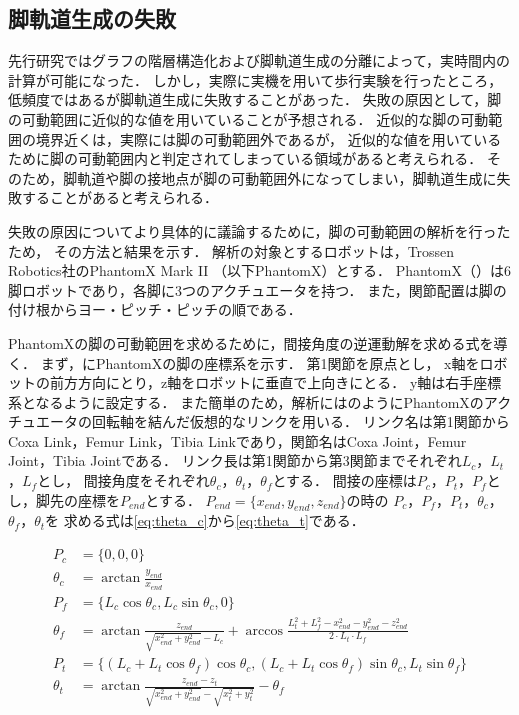 \subsection{脚軌道生成の失敗}
先行研究ではグラフの階層構造化および脚軌道生成の分離によって，実時間内の計算が可能になった．
しかし，実際に実機を用いて歩行実験を行ったところ，低頻度ではあるが脚軌道生成に失敗することがあった．
失敗の原因として，脚の可動範囲に近似的な値を用いていることが予想される．
近似的な脚の可動範囲の境界近くは，実際には脚の可動範囲外であるが，
近似的な値を用いているために脚の可動範囲内と判定されてしまっている領域があると考えられる．
そのため，脚軌道や脚の接地点が脚の可動範囲外になってしまい，脚軌道生成に失敗することがあると考えられる．

失敗の原因についてより具体的に議論するために，脚の可動範囲の解析を行ったため，
その方法と結果を示す．
解析の対象とするロボットは，Trossen Robotics社のPhantomX Mark I\hspace{-1.2pt}I \cite{cita:phantom_x_mark_2}  %
（以下PhantomX）とする．
PhantomX（）は6脚ロボットであり，各脚に3つのアクチュエータを持つ．
また，関節配置は脚の付け根からヨー・ピッチ・ピッチの順である．

PhantomXの脚の可動範囲を求めるために，間接角度の逆運動解を求める式を導く．
まず，にPhantomXの脚の座標系を示す．
第1関節を原点とし，
x軸をロボットの前方方向にとり，z軸をロボットに垂直で上向きにとる．
y軸は右手座標系となるように設定する．
また簡単のため，解析にはのようにPhantomXのアクチュエータの回転軸を結んだ仮想的なリンクを用いる．
リンク名は第1関節からCoxa Link，Femur Link，Tibia Linkであり，関節名はCoxa Joint，Femur Joint，Tibia Jointである．
リンク長は第1関節から第3関節までそれぞれ$L_c$，$L_t$，$L_f$とし，
間接角度をそれぞれ$\theta_c$，$\theta_t$，$\theta_f$とする．
間接の座標は$P_c$，$P_t$，$P_f$とし，脚先の座標を$P_{end}$とする．
$P_{end} = \{x_{end},y_{end},z_{end}\}$の時の
$P_c$，$P_f$，$P_t$，$\theta_c$，$\theta_f$，$\theta_t$を
求める式は\eqref{eq:theta_c}から\eqref{eq:theta_t}である．

\begin{align}
  P_c &= \{0,0,0\} \label{eq:theta_c} \\
  \theta_c &= \arctan \frac{y_{end}}{x_{end}}  \\
  P_f &= \{L_c \cos \theta_c, L_c \sin \theta_c, 0\}  \\
  \theta_f &= \arctan \frac{z_{end}}{\sqrt{x_{end}^2 + y_{end}^2} - L_c} + 
  \arccos \frac{L_t^2 + L_f^2 - x_{end}^2 - y_{end}^2 - z_{end}^2}{2 \cdot L_t \cdot L_f} \\
  P_t &= \{(L_c + L_t \cos \theta_f)\cos \theta_c ,
           (L_c + L_t \cos \theta_f) \sin \theta_c , 
                  L_t \sin \theta_f\}  \\
  \theta_t &= \arctan \frac{z_{end} - z_t}{\sqrt{x_{end}^2 + y_{end}^2} - 
              \sqrt{x_t^2 + y_t^2}} - \theta_f \label{eq:theta_t} 
\end{align}

